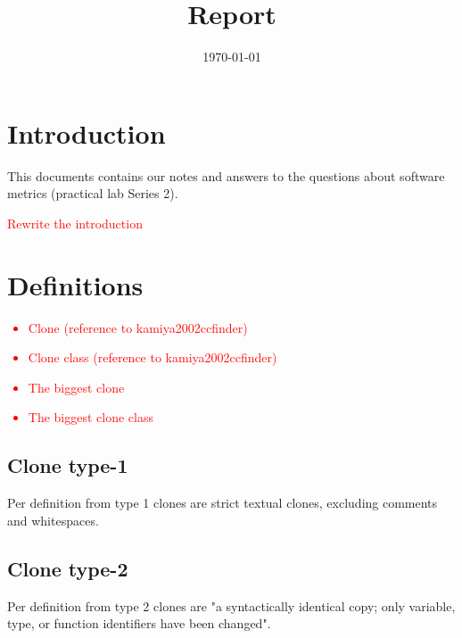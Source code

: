 \documentclass{uva-inf-article}
\title{Report}
\date{\today}
\newcommand\todo[1]{\textcolor{red}{#1}}
\begin{document}
\maketitle




\section{Introduction}

This documents contains our notes and answers to the questions about software metrics (practical lab Series 2).

\todo{Rewrite the introduction}

\section{Definitions}

\todo {
	\begin{itemize}
		\item{Clone (reference to kamiya2002ccfinder)}
		\item{Clone class (reference to kamiya2002ccfinder)}
		\item{The biggest clone }
		\item{The biggest clone class}
	\end{itemize}
}

\subsection{Clone type-1}
Per definition from \cite{koschke2008identifying} type 1 clones are strict textual clones, excluding comments and whitespaces.

\subsection{Clone type-2}
Per definition from \cite{koschke2008identifying} type 2 clones are "a syntactically identical copy; only variable, type, or function identifiers have been changed".
\end{document}
